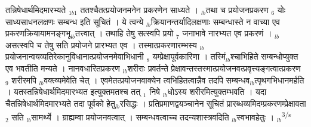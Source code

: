 \documentclass[article,12pt,a4paper]{memoir}%
\newcounter{parCount}
\begin{document}
{\color{DodgerBlue3}तन्निषेधार्थमिदमारभ्यते} {\tiny $_{1b1}$} ततश्चैतत्प्रयोजनमनेन प्रकरणेन साध्यते । {\tiny $_{lb}$}तथा च प्रयोजनप्रकरण {\tiny $_{6}$} योः साध्यसाधनलक्षणः सम्बन्ध इति सूचितं । ये त्वन्ये {\tiny $_{lb}$}क्रियानन्तर्यादिलक्षणाः सम्बन्धास्ते न वाच्या एव प्रकरणक्रियायामनङ्गभू{\tiny $_{lb}$}तत्त्वात् । तथाहि तेषु सत्स्वपि प्रयो {\tiny $_{7}$} जनाभावे नारभ्यत एव प्रकरणं । {\tiny $_{lb}$}असत्स्वपि च तेषु सति प्रयोजने प्रारभ्यत एव । तस्मात्प्रकरणारम्भस्य {\tiny $_{lb}$}प्रयोजनान्वयव्यतिरेकानुविधानात्प्रयोजनमेवाभिधानी {\tiny $_{8}$} यम्प्रेक्षापूर्वकारिणा । तस्मिं{\tiny $_{lb}$}श्चाभिहिते सम्बन्धोप्युक्त एव भवतीति मन्यते । नानवधारितप्रकरण {\tiny $_{lb}$}शरीराः प्रवर्तन्ते प्रेक्षावन्तस्तस्मात्प्रयोजनवत्प्रवृत्त्यङ्गत्वात्प्रकरण {\tiny $_{9}$}\leavevmode{} शरीरमपि {\tiny $_{lb}$}वक्त्व्यमेवेति चेत् । एवमेतत्प्रयोजनवाक्येन त्वभिहितत्वान्नैव तदपि सम्बन्धव{\tiny $_{lb}$}त्पृथगभिधानमर्हति । यतस्तन्निषेधार्थमिदमारभ्यत इत्युक्तमतश्च तत् {\tiny $_{1}$} निषे {\tiny $_{lb}$}धोऽस्य शरीरमित्युक्तम्भवति । यदा चैतन्निषेधार्थमिदमारभ्यते तदा पूर्वको हेतु{\tiny $_{lb}$}रसिद्धः । प्रतिप्रमाणद्वयञ्चानेन सूचितं प्रारब्धव्यमिदम्प्रकरणम्प्रेक्षावता {\tiny $_{2}$} सति {\tiny $_{lb}$}सामर्थ्ये । ग्राह्यम्वा प्रयोजनवत्वात् । सम्बन्धवत्वाच्च तदन्यशास्त्रवदिति {\tiny $_{lb}$}स्वभावहेतुः ।
	{}
	\pend%
      {\tiny $_{lb}$}\textsuperscript{\textenglish{3/s}}
\end{document}
